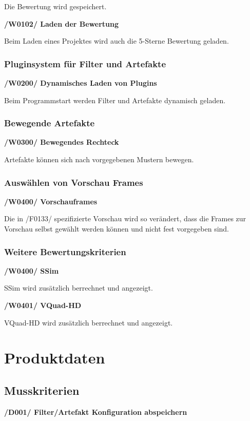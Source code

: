 \documentclass[parskip=full]{scrartcl}
\begin{document}
Die Bewertung wird gespeichert.

\textbf{/W0102/ Laden der Bewertung}

Beim Laden eines Projektes wird auch die 5-Sterne Bewertung geladen.


\subsubsection{Pluginsystem für Filter und Artefakte}

\textbf{/W0200/ Dynamisches Laden von Plugins}

Beim Programmstart werden Filter und Artefakte dynamisch geladen.

\subsubsection{Bewegende Artefakte}

\textbf{/W0300/ Bewegendes Rechteck}

Artefakte können sich nach vorgegebenen Mustern bewegen.

\subsubsection{Auswählen von Vorschau Frames}

\textbf{/W0400/ Vorschauframes}

Die in /F0133/ spezifizierte Vorschau wird so verändert, dass die Frames zur Vorschau selbst gewählt werden können und nicht fest vorgegeben sind.

\subsubsection{Weitere Bewertungskriterien}

\textbf{/W0400/ SSim}

SSim wird zusätzlich berrechnet und angezeigt.

\textbf{/W0401/ VQuad-HD}

VQuad-HD wird zusätzlich berrechnet und angezeigt.


\newpage
\section{Produktdaten}
\subsection{Musskriterien}
\textbf{/D001/ Filter/Artefakt Konfiguration abspeichern}
\end{document}
